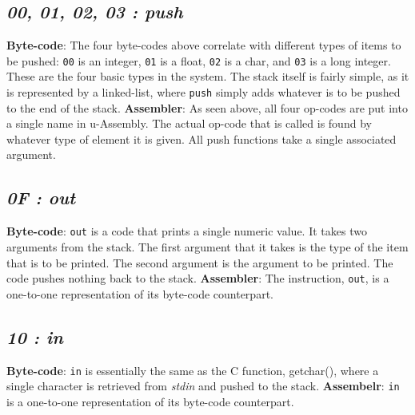 \documentclass[12pt]{report}
\begin{document}
  \subsection{\emph{00, 01, 02, 03 : push}}
  \textbf{Byte-code}: The four byte-codes above correlate with different types of
  items to be pushed: \verb|00| is an integer, \verb|01| is a float, \verb|02| is a
  char, and \verb|03| is a long integer.  These are the four basic types in the system.
  The stack itself is fairly simple, as it is represented by a linked-list, where
  \verb|push| simply adds whatever is to be pushed to the end of the stack.\newline
  \textbf{Assembler}: As seen above, all four op-codes are put into a single name in
  u-Assembly.  The actual op-code that is called is found by whatever type of
  element it is given.
  \newline
  All push functions take a single associated argument.
  \subsection{\emph{0F : out}}
  \textbf{Byte-code}: \verb|out| is a code that prints a single numeric value.  It
  takes two arguments from the stack.  The first argument that it takes is the 
  type of the item that is to be printed.  The second argument is the argument 
  to be printed.  The code pushes nothing back to the stack.\newline
  \textbf{Assembler}: The instruction, \verb|out|, is a one-to-one representation of
  its byte-code counterpart.
  \subsection{\emph{10 : in}}
  \textbf{Byte-code}: \verb|in| is essentially the same as the C function, getchar(),
  where a single character is retrieved from \emph{stdin} and pushed to the stack.
  \textbf{Assembelr}: \verb|in| is a one-to-one representation of its byte-code
  counterpart.
\end{document}
